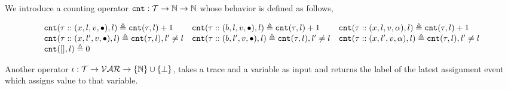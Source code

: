   We introduce a counting operator $\mathtt{cnt} : \mathcal{T} \to \mathbb{N} \to \mathbb{N}$ whose behavior is defined as follows,
  \begin{defn}
    \[
  \begin{array}{lll}
  \mathtt{cnt}(\mathtt{\tau} :: (x, l, v, \bullet), l ) \triangleq \mathtt{cnt}(\mathtt{\tau}, l) + 1
  &
  \mathtt{cnt}(\mathtt{\tau}  ::(b, l, v, \bullet), l) \triangleq \mathtt{cnt}(\mathtt{\tau}, l) + 1
  &
  \mathtt{cnt}(\mathtt{\tau}  :: (x, l, v, \alpha), l) \triangleq \mathtt{cnt}(\mathtt{\tau}, l) + 1
  \\
  \mathtt{cnt}(\mathtt{\tau}  :: (x, l', v, \bullet), l) \triangleq \mathtt{cnt}(\mathtt{\tau}, l), l' \neq l
  &
  \mathtt{cnt}(\mathtt{\tau}  :: (b, l', v, \bullet), l) \triangleq \mathtt{cnt}(\mathtt{\tau}, l), l' \neq l
  &
  \mathtt{cnt}(\mathtt{\tau}  :: (x, l', v, \alpha), l) \triangleq \mathtt{cnt}(\mathtt{\tau}, l), l' \neq l
  \\
  \mathtt{cnt}({[]}, l) \triangleq 0
  &&
  \end{array}
  \]
\end{defn}
Another operator $\iota : \mathcal{T} \to \mathcal{VAR} \to \{\mathbb{N}\}\cup \{\bot\}$,
takes a trace and a variable as input and returns the label of the latest assignment event which assigns value to that variable. 
